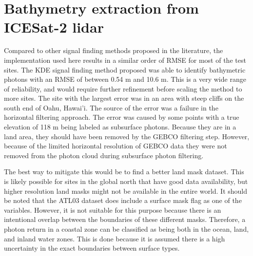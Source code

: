 

\section{Bathymetry extraction from ICESat-2 lidar}

Compared to other signal finding methods proposed in the literature, the implementation used here results in a similar order of RMSE for most of the test sites. The KDE signal finding method proposed was able to identify bathymetric photons with an RMSE of between 0.54 m and 10.6 m. This is a very wide range of reliability, and would require further refinement before scaling the method to more sites. The site with the largest error was in an area with steep cliffs on the south end of Oahu, Hawai'i. The source of the error was a failure in the horizontal filtering approach. The error was caused by some points with a true elevation of 118 m being labeled as subsurface photons. Because they are in a land area, they should have been removed by the GEBCO filtering step. However, because of the limited horizontal resolution of GEBCO data they were not removed from the photon cloud during subsurface photon filtering.

The best way to mitigate this would be to find a better land mask dataset. This is likely possible for sites in the global north that have good data availability, but higher resolution land masks might not be available in the entire world. It should be noted that the ATL03 dataset does include a surface mask flag as one of the variables. However, it is not suitable for this purpose because there is an intentional overlap between the boundaries of these different masks. Therefore, a photon return in a coastal zone can be classified as being both in the ocean, land, and inland water zones. This is done because it is assumed there is a high uncertainty in the exact boundaries between surface types. 


